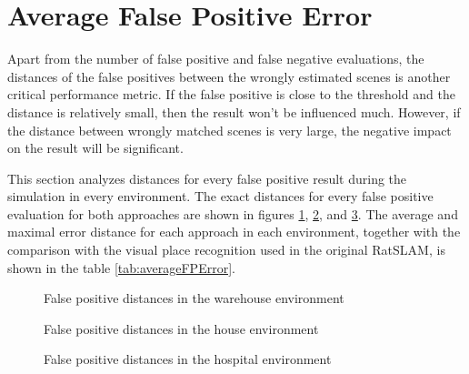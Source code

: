 \section{Average False Positive Error}\label{section:averageError}

Apart from the number of false positive and false negative evaluations, the distances of the false positives between the wrongly estimated scenes is another critical performance metric. If the false positive is close to the threshold and the distance is relatively small, then the result won't be influenced much. However, if the distance between wrongly matched scenes is very large, the negative impact on the result will be significant.\par
This section analyzes distances for every false positive result during the simulation in every environment. The exact distances for every false positive evaluation for both approaches are shown in figures \ref{fig:averageFPErrorWarehouse}, \ref{fig:averageFPErrorHouse}, and \ref{fig:averageFPErrorHospital}. The average and maximal error distance for each approach in each environment, together with the comparison with the visual place recognition used in the original RatSLAM, is shown in the table \ref{tab:averageFPError}.\par

\begin{figure}[!tbp]
    \centering
    \hfill
    \caption{False positive distances in the warehouse environment}
    \label{fig:averageFPErrorWarehouse}
\end{figure}

\begin{figure}[!tbp]
    \centering
    \hfill
    \caption{False positive distances in the house environment}
    \label{fig:averageFPErrorHouse}
\end{figure}

\begin{figure}[!tbp]
    \centering
    \hfill
    \caption{False positive distances in the hospital environment}
    \label{fig:averageFPErrorHospital}
\end{figure}

